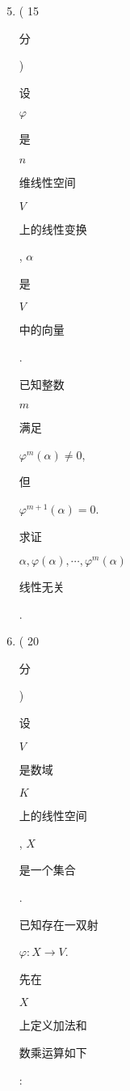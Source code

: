 \documentclass[10pt]{article}
\begin{document}
\begin{enumerate}
  \setcounter{enumi}{4}
  \item ( 15 \begin{CJK}{UTF8}{mj}分\end{CJK}) \begin{CJK}{UTF8}{mj}设\end{CJK} $\varphi$ \begin{CJK}{UTF8}{mj}是\end{CJK} $n$ \begin{CJK}{UTF8}{mj}维线性空间\end{CJK} $V$ \begin{CJK}{UTF8}{mj}上的线性变换\end{CJK}, $\alpha$ \begin{CJK}{UTF8}{mj}是\end{CJK} $V$ \begin{CJK}{UTF8}{mj}中的向量\end{CJK}. \begin{CJK}{UTF8}{mj}已知整数\end{CJK} $m$ \begin{CJK}{UTF8}{mj}满足\end{CJK} $\varphi^{m}(\alpha) \neq 0$, \begin{CJK}{UTF8}{mj}但\end{CJK} $\varphi^{m+1}(\alpha)=0$. \begin{CJK}{UTF8}{mj}求证\end{CJK} $\alpha, \varphi(\alpha), \cdots, \varphi^{m}(\alpha)$ \begin{CJK}{UTF8}{mj}线性无关\end{CJK}.

  \item ( 20 \begin{CJK}{UTF8}{mj}分\end{CJK}) \begin{CJK}{UTF8}{mj}设\end{CJK} $V$ \begin{CJK}{UTF8}{mj}是数域\end{CJK} $K$ \begin{CJK}{UTF8}{mj}上的线性空间\end{CJK}, $X$ \begin{CJK}{UTF8}{mj}是一个集合\end{CJK}. \begin{CJK}{UTF8}{mj}已知存在一双射\end{CJK} $\varphi: X \rightarrow V$. \begin{CJK}{UTF8}{mj}先在\end{CJK} $X$ \begin{CJK}{UTF8}{mj}上定义加法和\end{CJK} \begin{CJK}{UTF8}{mj}数乘运算如下\end{CJK}:

\end{enumerate}
\end{document}
